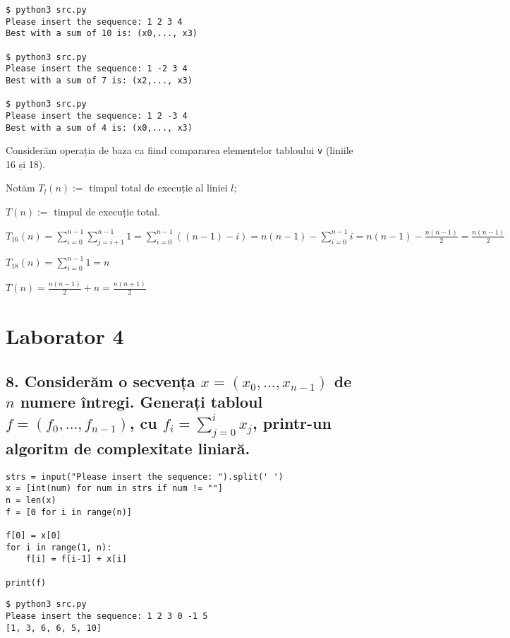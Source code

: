 \documentclass[11pt]{article}
\begin{document}
\begin{verbatim}
$ python3 src.py
Please insert the sequence: 1 2 3 4
Best with a sum of 10 is: (x0,..., x3)

$ python3 src.py
Please insert the sequence: 1 -2 3 4
Best with a sum of 7 is: (x2,..., x3)

$ python3 src.py
Please insert the sequence: 1 2 -3 4
Best with a sum of 4 is: (x0,..., x3)
\end{verbatim}

Considerăm operația de baza ca fiind compararea elementelor tabloului \texttt{v} (liniile 16 și 18).

Notăm $T_l(n) := $ timpul total de execuție al liniei $l$; 

$T(n) :=$ timpul de execuție total.
\newline

$T_{16}(n) = \sum\limits_{i=0}^{n-1} \sum\limits_{j=i+1}^{n-1}1 
= \sum\limits_{i=0}^{n-1}\left((n-1)-i\right)
= n(n-1) - \sum\limits_{i=0}^{n-1}i 
= n(n-1) - \frac{n(n-1)}{2}
= \frac{n(n-1)}{2}$

$T_{18}(n) = \sum\limits_{i=0}^{n-1}1 = n$

$T(n) = \frac{n(n-1)}{2} + n = \frac{n(n+1)}{2}$

\pagebreak

\section*{Laborator 4}
\label{sec:org43ee7b4}
\subsection*{8. Considerăm o secvența \(x = (x_0, ..., x_{n-1})\) de \(n\) numere întregi. Generați tabloul \(f = (f_0, ..., f_{n-1})\), cu \(f_i = \sum\limits_{j=0}^{i}x_j\), printr-un algoritm de complexitate liniară.}
\label{sec:org9e1ef36}

\begin{verbatim}
strs = input("Please insert the sequence: ").split(' ')
x = [int(num) for num in strs if num != ""]
n = len(x)
f = [0 for i in range(n)]

f[0] = x[0]
for i in range(1, n):
    f[i] = f[i-1] + x[i]

print(f)

\end{verbatim}

\begin{verbatim}
$ python3 src.py
Please insert the sequence: 1 2 3 0 -1 5
[1, 3, 6, 6, 5, 10]
\end{verbatim}
\end{document}
